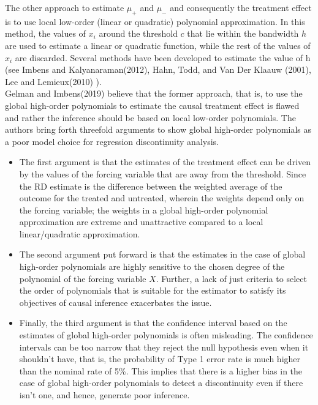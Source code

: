 \documentclass[fleqn]{article}
\begin{document}
    The other approach to estimate $\mu_{+}$ and $\mu_{-}$ and consequently the treatment effect is to use local low-order (linear or quadratic) polynomial approximation. In this method, the values of $x_{i}$ around the threshold $c$ that lie within the bandwidth $h$ are used to estimate a linear or quadratic function, while the rest of the values of $x_{i}$ are discarded. Several methods have been developed to estimate the value of h (see Imbens and Kalyanaraman(2012)\cite{imbens2012optimal}, Hahn, Todd, and Van Der Klaauw (2001)\cite{hahn2001identification}, Lee and Lemieux(2010) \cite{lee2010regression}).\\

    Gelman and Imbens(2019)\cite{gelman2019high} believe that the former approach, that is, to use the global high-order polynomials to estimate the causal treatment effect is flawed and rather the inference should be based on local low-order polynomials. The authors bring forth threefold arguments to show global high-order polynomials as a poor model choice for regression discontinuity analysis.\\

    \begin{itemize}
        \item The first argument is that the estimates of the treatment effect can be driven by the values of the forcing variable that are away from the threshold. Since the RD estimate is the difference between the weighted average of the outcome for the treated and untreated, wherein the weights depend only on the forcing variable; the weights in a global high-order polynomial approximation are extreme and unattractive compared to a local linear/quadratic approximation.
        \item The second argument put forward is that the estimates in the case of global high-order polynomials are highly sensitive to the chosen degree of the polynomial of the forcing variable $X$. Further, a lack of just criteria to select the order of polynomials that is suitable for the estimator to satisfy its objectives of causal inference exacerbates the issue.
        \item Finally, the third argument is that the confidence interval based on the estimates of global high-order polynomials is often misleading. The confidence intervals can be too narrow that they reject the null hypothesis even when it shouldn't have, that is, the probability of Type 1 error rate is much higher than the nominal rate of 5\%. This implies that there is a higher bias in the case of global high-order polynomials to detect a discontinuity even if there isn't one, and hence, generate poor inference.
    \end{itemize}
\end{document}
